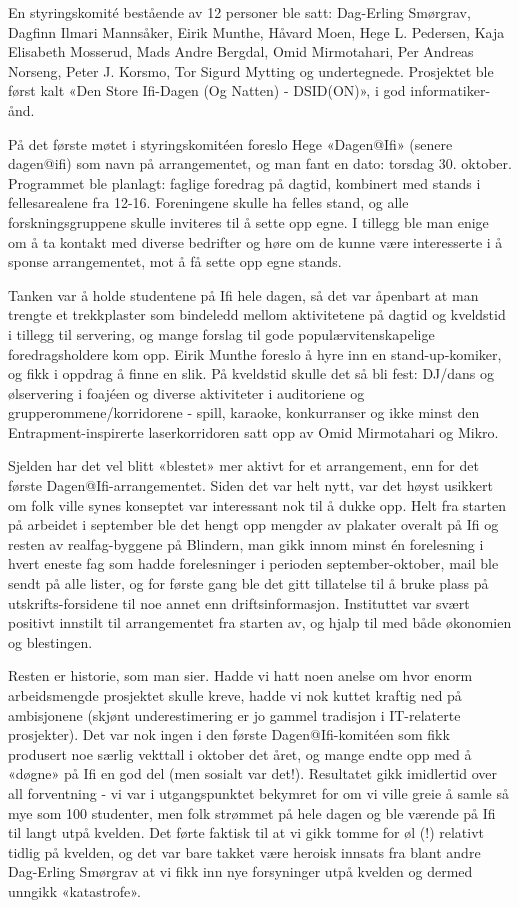 \documentclass[../main.tex]{subfiles}
\begin{document}
En styringskomité bestående av 12 personer ble satt: Dag-Erling Smørgrav, Dagfinn Ilmari Mannsåker, Eirik Munthe, Håvard Moen, Hege L. Pedersen, Kaja Elisabeth Mosserud, Mads Andre Bergdal, Omid Mirmotahari, Per Andreas Norseng, Peter J. Korsmo, Tor Sigurd Mytting og undertegnede. Prosjektet ble først kalt «Den Store Ifi-Dagen (Og Natten) - DSID(ON)», i god informatiker-ånd.

På det første møtet i styringskomitéen foreslo Hege «Dagen@Ifi» (senere dagen@ifi) som navn på arrangementet, og man fant en dato: torsdag 30. oktober. Programmet ble planlagt: faglige foredrag på dagtid, kombinert med stands i fellesarealene fra 12-16. Foreningene skulle ha felles stand, og alle forskningsgruppene skulle inviteres til å sette opp egne. I tillegg ble man enige om å ta kontakt med diverse bedrifter og høre om de kunne være interesserte i å sponse arrangementet, mot å få sette opp egne stands.

Tanken var å holde studentene på Ifi hele dagen, så det var åpenbart at man trengte et trekkplaster som bindeledd mellom aktivitetene på dagtid og kveldstid i tillegg til servering, og mange forslag til gode populærvitenskapelige foredragsholdere kom opp. Eirik Munthe foreslo å hyre inn en stand-up-komiker, og fikk i oppdrag å finne en slik. På kveldstid skulle det så bli fest: DJ/dans og ølservering i foajéen og diverse aktiviteter i auditoriene og grupperommene/korridorene - spill, karaoke, konkurranser og ikke minst den Entrapment-inspirerte laserkorridoren satt opp av Omid Mirmotahari og Mikro.

Sjelden har det vel blitt «blestet» mer aktivt for et arrangement, enn for det første Dagen@Ifi-arrangementet. Siden det var helt nytt, var det høyst usikkert om folk ville synes konseptet var interessant nok til å dukke opp. Helt fra starten på arbeidet i september ble det hengt opp mengder av plakater overalt på Ifi og resten av realfag-byggene på Blindern, man gikk innom minst én forelesning i hvert eneste fag som hadde forelesninger i perioden september-oktober, mail ble sendt på alle lister, og for første gang ble det gitt tillatelse til å bruke plass på utskrifts-forsidene til noe annet enn driftsinformasjon. Instituttet var svært positivt innstilt til arrangementet fra starten av, og hjalp til med både økonomien og blestingen.

Resten er historie, som man sier. Hadde vi hatt noen anelse om hvor enorm arbeidsmengde prosjektet skulle kreve, hadde vi nok kuttet kraftig ned på ambisjonene (skjønt underestimering er jo gammel tradisjon i IT-relaterte prosjekter). Det var nok ingen i den første Dagen@Ifi-komitéen som fikk produsert noe særlig vekttall i oktober det året, og mange endte opp med å «døgne» på Ifi en god del (men sosialt var det!). Resultatet gikk imidlertid over all forventning - vi var i utgangspunktet bekymret for om vi ville greie å samle så mye som 100 studenter, men folk strømmet på hele dagen og ble værende på Ifi til langt utpå kvelden. Det førte faktisk til at vi gikk tomme for øl (!) relativt tidlig på kvelden, og det var bare takket være heroisk innsats fra blant andre Dag-Erling Smørgrav at vi fikk inn nye forsyninger utpå kvelden og dermed unngikk «katastrofe».
\end{document}

